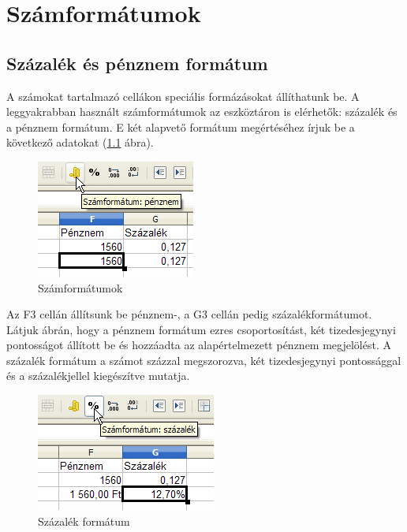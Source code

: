 \chapter{Számformátumok}
\thispagestyle{empty}

\section{Százalék és pénznem formátum}

A számokat tartalmazó cellákon speciális formázásokat
állíthatunk be. A leggyakrabban használt számformátumok az
eszköztáron is elérhetők: százalék és a pénznem
formátum. E két alapvető formátum megértéséhez írjuk
be a következő adatokat (\ref{Számformátumok} ábra).

\begin{figure}[!h]
\begin{center}
\includegraphics[width=5.211cm]{oocalcv2-img42.png}
\caption{Számformátumok}\label{Számformátumok}
\end{center}
\end{figure}

Az F3 cellán állítsunk be pénznem-, a G3 cellán pedig
százalékformátumot. Látjuk  ábrán, hogy a pénznem
formátum ezres csoportosítást, két tizedesjegynyi pontosságot
állított be és hozzáadta az alapértelmezett pénznem
megjelölést. A százalék formátum a számot százzal
megszorozva, két tizedesjegynyi pontossággal és a
százalékjellel kiegészítve mutatja.

\begin{figure}[!h]
\begin{center}
\includegraphics[width=5.898cm]{oocalcv2-img43.png}
\caption{Százalék formátum}\label{SzázalékFormátum}
\end{center}
\end{figure}

